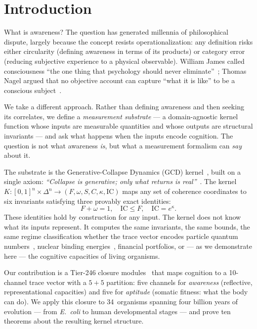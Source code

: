 \documentclass[
  aps,
  prd,
  twocolumn,
  superscriptaddress,
  nofootinbib,
  floatfix
]{revtex4-2}
\newcommand{\beq}{\begin{equation}}
\newcommand{\eeq}{\end{equation}}
\newcommand{\IC}{\mathrm{IC}}
\begin{document}
\section{Introduction}\label{sec:intro}

What is awareness?  The question has generated millennia
of philosophical dispute, largely because the concept resists
operationalization: any definition risks either circularity
(defining awareness in terms of its products) or category
error (reducing subjective experience to a physical observable).
William James called consciousness ``the one thing that
psychology should never
eliminate''~\cite{james1890principles}; Thomas Nagel
argued that no objective account can capture ``what it is
like'' to be a conscious subject~\cite{nagel1974bat}.

We take a different approach.  Rather than defining awareness
and then seeking its correlates, we define a \emph{measurement
substrate} --- a domain-agnostic kernel function whose inputs
are measurable quantities and whose outputs are structural
invariants --- and ask what happens when the inputs encode
cognition.  The question is not what awareness \emph{is}, but
what a measurement formalism can \emph{say} about it.

The substrate is the Generative-Collapse Dynamics (GCD)
kernel~\cite{paulus2025umcp,paulus2025physicscoherence},
built on a single axiom: \emph{``Collapse is generative;
only what returns is real''}~\cite{paulus2026umcpcasepack}.
The kernel $K\!: [0,1]^n \times \Delta^n
\to (F, \omega, S, C, \kappa, \IC)$ maps any set of coherence coordinates to
six invariants satisfying three provably exact identities:
\beq\label{eq:tier1}
  F + \omega = 1, \quad
  \IC \leq F, \quad
  \IC = e^{\kappa}.
\eeq
These identities hold by construction for any input.  The
kernel does not know what its inputs represent.  It computes
the same invariants, the same bounds, the same regime
classification whether the trace vector encodes particle
quantum numbers~\cite{paulus2026sm}, nuclear binding
energies~\cite{weizsacker1935,bethe1936}, financial
portfolios, or --- as we demonstrate here --- the
cognitive capacities of living organisms.

Our contribution is a Tier-246 closure modules~\cite{paulus2025umcp}
that maps cognition to a 10-channel trace vector with a
$5\!+\!5$ partition: five channels for \emph{awareness}
(reflective, representational capacities) and five for
\emph{aptitude} (somatic fitness: what the body can do).
We apply this closure to 34~organisms spanning four billion
years of evolution --- from \emph{E.~coli} to human
developmental stages --- and prove ten theorems about the
resulting kernel structure.
\end{document}
